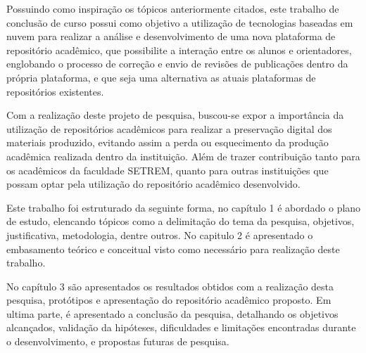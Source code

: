 Possuindo como inspiração os tópicos anteriormente citados,
este trabalho de conclusão de curso possui como objetivo a utilização
de tecnologias baseadas em nuvem para realizar a análise e
desenvolvimento de uma nova plataforma de repositório acadêmico,
que possibilite a interação entre os alunos e orientadores,
englobando o processo de correção e envio de revisões
de publicações dentro da própria plataforma, e que seja uma alternativa
as atuais plataformas de repositórios existentes.

Com a realização deste projeto de pesquisa, buscou-se expor a
importância da utilização de repositórios acadêmicos para realizar
a preservação digital dos materiais produzido, evitando assim a perda
ou esquecimento da produção acadêmica realizada dentro da instituição.
Além de trazer contribuição tanto para os acadêmicos da faculdade SETREM, quanto para outras
instituições que possam optar pela utilização do repositório
acadêmico desenvolvido.

Este trabalho foi estruturado da seguinte forma, no capítulo 1
é abordado o plano de estudo, elencando tópicos como a delimitação
do tema da pesquisa, objetivos, justificativa, metodologia, dentre outros.
No capitulo 2 é apresentado o embasamento teórico e conceitual
visto como necessário para realização deste trabalho.

No capítulo 3 são apresentados os resultados obtidos com a realização desta
pesquisa, protótipos e apresentação do repositório acadêmico proposto.
Em ultima parte, é apresentado a conclusão da pesquisa,
detalhando os objetivos alcançados, validação da hipóteses, dificuldades
e limitações encontradas durante o desenvolvimento, e propostas futuras
de pesquisa.